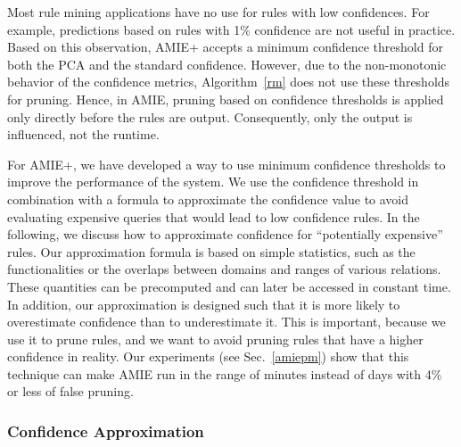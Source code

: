 

Most rule mining applications have no use for rules with low confidences. For example, predictions based on rules with 1\% confidence are not useful in practice.
Based on this observation, AMIE+ accepts a minimum confidence threshold for both the PCA and the standard confidence. However,
due to the non-monotonic behavior of the confidence metrics, Algorithm~\ref{rm} does not use these thresholds for pruning.
Hence, in AMIE, pruning based on confidence thresholds is applied only directly before the rules are output. Consequently, only the output is influenced, not the runtime.

For AMIE+, we have developed a way to use minimum confidence thresholds to improve the performance of the system.  
We use the confidence threshold in combination with a formula to approximate the confidence value to avoid evaluating expensive queries that would lead to low confidence rules.
In the following, we discuss how to approximate confidence  for ``potentially expensive'' rules. 
Our approximation formula is based on simple statistics, such as the functionalities or the overlaps between domains and ranges of various relations. These quantities
can be precomputed and can later be accessed in constant time. In addition, our approximation is designed such that it is more likely to overestimate confidence than to underestimate it.
This is important, because we use it to prune rules, and we want to avoid pruning rules that have a higher confidence in reality.
Our experiments (see Sec.~\ref{amiepm}) show that this technique can make AMIE run in the range of minutes instead of days with 4\% or less of false pruning.


\subsubsection{Confidence Approximation}


